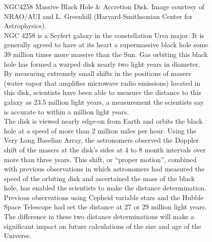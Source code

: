 \documentclass[10pt,a4paper,english]{article}
\begin{document}
\begin{figure}[!ht]
\begin{minipage}{.49\textwidth}
        \vspace{1ex}
        \caption{
            NGC4258 Massive Black Hole \& Accretion Disk. Image courtesy of
            NRAO/AUI and L. Greenhill (Harvard-Smithsonian Center for
            Astrophysics).\vspace{1ex}\\
            NGC 4258 is a Seyfert galaxy in the constellation Ursa major. It is
            generally agreed to have at its heart a supermassive black hole
            some 39 million times more massive than the Sun. Gas orbiting this
            black hole has formed a warped disk nearly two light years in
            diameter. By measuring extremely small shifts in the positions of
             masers (water vapor that amplifies microwave radio
            emissions) located in this disk, scientists have been able to
            measure the distance to this galaxy as 23.5 million light years, a
            measurement the scientists say is accurate to within a million
            light years.\vspace{1ex}\\
            The disk is viewed nearly edge-on from Earth and orbits the black
            hole at a speed of more than 2 million miles per hour. Using the
            Very Long Baseline Array, the astronomers observed the Doppler
            shift of the masers at the disk's sides at 4 to 8 month intervals
            over more than three years. This shift, or “proper motion”,
            combined with previous observations in which astronomers had
            measured the speed of the orbiting disk and ascertained the mass of
            the black hole, has enabled the scientists to make the distance
            determination.\vspace{1ex}\\
            Previous observations using Cepheid variable stars and the Hubble
            Space Telescope had set the distance at 27 or 29 million light
            years. The difference in these two distance determinations will
            make a significant impact on future calculations of the size and
            age of the Universe.
        }
    \end{minipage}%
    \hfill
    \begin{minipage}{.49\textwidth}

\end{minipage}
\end{figure}
\end{document}
